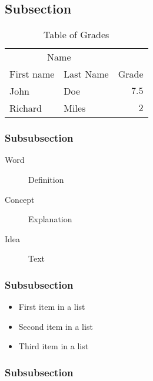 \documentclass[fleqn,10pt]{SelfArx} %
\begin{document}
	\lipsum[10] %
	
	\subsection{Subsection}
	
	\lipsum[11] %
	
	\begin{table}[hbt]
		\caption{Table of Grades}
		\centering
		\begin{tabular}{llr}
			\toprule
			\multicolumn{2}{c}{Name} \\
			\cmidrule(r){1-2}
			First name & Last Name & Grade \\
			\midrule
			John & Doe & $7.5$ \\
			Richard & Miles & $2$ \\
			\bottomrule
		\end{tabular}
		\label{tab:label}
	\end{table}
	
	\subsubsection{Subsubsection}
	
	\lipsum[12] %
	
	\begin{description}
		\item[Word] Definition
		\item[Concept] Explanation
		\item[Idea] Text
	\end{description}
	
	\subsubsection{Subsubsection}
	
	\lipsum[13] %
	
	\begin{itemize}[noitemsep] %
		\item First item in a list
		\item Second item in a list
		\item Third item in a list
	\end{itemize}
	
	\subsubsection{Subsubsection}
	
\end{document}
